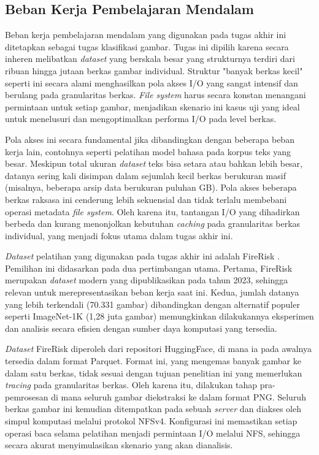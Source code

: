 \subsection{Beban Kerja Pembelajaran Mendalam}
Beban kerja pembelajaran mendalam yang digunakan pada tugas akhir ini ditetapkan sebagai tugas klasifikasi gambar. Tugas ini dipilih karena secara inheren melibatkan \textit{dataset} yang berskala besar yang strukturnya terdiri dari ribuan hingga jutaan berkas gambar individual. Struktur "banyak berkas kecil" seperti ini secara alami menghasilkan pola akses I/O yang sangat intensif dan berulang pada granularitas berkas. \textit{File system} harus secara konstan menangani permintaan untuk setiap gambar, menjadikan skenario ini kasus uji yang ideal untuk menelusuri dan mengoptimalkan performa I/O pada level berkas.

Pola akses ini secara fundamental jika dibandingkan dengan beberapa beban kerja lain, contohnya seperti pelatihan model bahasa pada korpus teks yang besar. Meskipun total ukuran \textit{dataset} teks bisa setara atau bahkan lebih besar, datanya sering kali disimpan dalam sejumlah kecil berkas berukuran masif (misalnya, beberapa arsip data berukuran puluhan GB). Pola akses beberapa berkas raksasa ini cenderung lebih sekuensial dan tidak terlalu membebani operasi metadata \textit{file system}. Oleh karena itu, tantangan I/O yang dihadirkan berbeda dan kurang menonjolkan kebutuhan \textit{caching} pada granularitas berkas individual, yang menjadi fokus utama dalam tugas akhir ini.

\textit{Dataset} pelatihan yang digunakan pada tugas akhir ini adalah FireRisk \parencite{FireRisk}. Pemilihan ini didasarkan pada dua pertimbangan utama. Pertama, FireRisk merupakan \textit{dataset} modern yang dipublikasikan pada tahun 2023, sehingga relevan untuk merepresentasikan beban kerja saat ini. Kedua, jumlah datanya yang lebih terkendali (70.331 gambar) dibandingkan dengan alternatif populer seperti ImageNet-1K (1,28 juta gambar) memungkinkan dilakukannya eksperimen dan analisis secara efisien dengan sumber daya komputasi yang tersedia.

\textit{Dataset} FireRisk diperoleh dari repositori HuggingFace, di mana ia pada awalnya tersedia dalam format Parquet. Format ini, yang mengemas banyak gambar ke dalam satu berkas, tidak sesuai dengan tujuan penelitian ini yang memerlukan \textit{tracing} pada granularitas berkas. Oleh karena itu, dilakukan tahap pra-pemrosesan di mana seluruh gambar diekstraksi ke dalam format PNG. Seluruh berkas gambar ini kemudian ditempatkan pada sebuah \textit{server} dan diakses oleh simpul komputasi melalui protokol NFSv4. Konfigurasi ini memastikan setiap operasi baca selama pelatihan menjadi permintaan I/O melalui NFS, sehingga secara akurat menyimulasikan skenario yang akan dianalisis.

